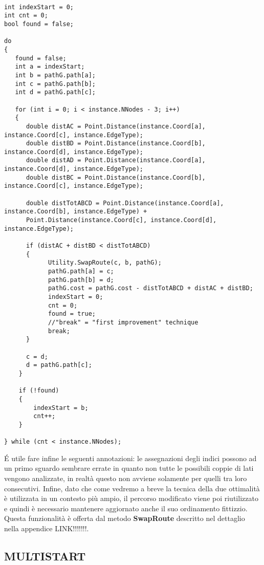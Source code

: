 \documentclass[11pt]{article}
\begin{document}
\begin{lstlisting}

int indexStart = 0;
int cnt = 0;
bool found = false;

do
{
   found = false;
   int a = indexStart;
   int b = pathG.path[a];
   int c = pathG.path[b];
   int d = pathG.path[c];

   for (int i = 0; i < instance.NNodes - 3; i++)
   {
      double distAC = Point.Distance(instance.Coord[a], instance.Coord[c], instance.EdgeType);
      double distBD = Point.Distance(instance.Coord[b], instance.Coord[d], instance.EdgeType);
      double distAD = Point.Distance(instance.Coord[a], instance.Coord[d], instance.EdgeType);
      double distBC = Point.Distance(instance.Coord[b], instance.Coord[c], instance.EdgeType);

      double distTotABCD = Point.Distance(instance.Coord[a], instance.Coord[b], instance.EdgeType) +
      Point.Distance(instance.Coord[c], instance.Coord[d], instance.EdgeType);

      if (distAC + distBD < distTotABCD)
      {
            Utility.SwapRoute(c, b, pathG);
            pathG.path[a] = c;
            pathG.path[b] = d;
            pathG.cost = pathG.cost - distTotABCD + distAC + distBD;
            indexStart = 0;
            cnt = 0;
            found = true;
            //"break" = "first improvement" technique
            break;
      }
      
      c = d;
      d = pathG.path[c];
    }

    if (!found)
    {
        indexStart = b;
        cnt++;
    }

} while (cnt < instance.NNodes);

\end{lstlisting}

\'E utile fare infine le seguenti annotazioni: le assegnazioni degli indici possono ad un primo sguardo sembrare errate in quanto non tutte le possibili coppie di lati vengono analizzate, in realtà questo non avviene solamente per quelli tra loro consecutivi. Infine, dato che come vedremo a breve la tecnica della due ottimalità è utilizzata in un contesto più ampio, il percorso modificato viene poi riutilizzato e quindi è necessario mantenere aggiornato anche il suo ordinamento fittizzio. Questa funzionalità è offerta dal metodo \textbf{SwapRoute} descritto nel dettaglio nella appendice LINK!!!!!!!.

\subsection*{MULTISTART}
\end{document}
